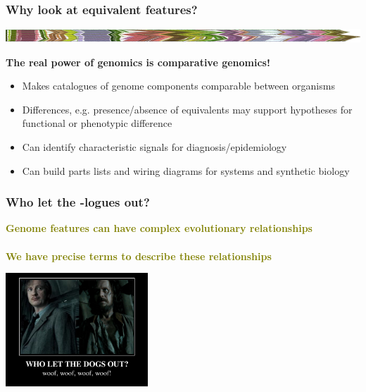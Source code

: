 \begin{frame}
  \frametitle{Why look at equivalent features?}
  \begin{center}
    \includegraphics[width=1\textwidth]{images/collinear_zeae}  
  \end{center}
  \textbf{The real power of genomics is comparative genomics!}
  \begin{itemize}
    \item Makes catalogues of genome components comparable between organisms
    \item \textcolor{hutton_blue}{Differences, e.g. presence/absence of equivalents may support hypotheses for functional or phenotypic difference}
    \item \textcolor{hutton_green}{Can identify characteristic signals for diagnosis/epidemiology}
    \item \textcolor{hutton_purple}{Can build parts lists and wiring diagrams for systems and synthetic biology}
  \end{itemize}
\end{frame}

%
\begin{frame}
  \frametitle{Who let the -logues out?}
  \Large{
    \textcolor{olive}{
      \textbf{
      Genome features can have complex evolutionary relationships \\~\\
      We have precise terms to describe these relationships
      }
    }
  }
  \begin{center}
    \includegraphics[width=0.4\textwidth]{images/who_let_the_dogs_out}
  \end{center}      
\end{frame}

